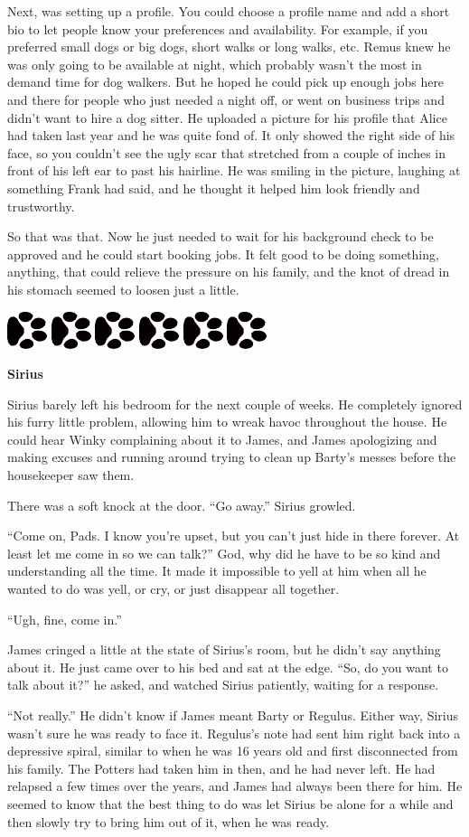 \documentclass[12pt,twoside,openright]{memoir}
\newcommand{\myrulez}{	
	\begin{center}
		\hspace{.5em}
		\includegraphics[angle=60]{dogprint.pdf}
		\hspace{.5em}
		\includegraphics[angle=120]{dogprint.pdf}
		\hspace{.5em}
		\includegraphics[angle=60]{dogprint.pdf}
		\hspace{.5em}
		\includegraphics[angle=120]{dogprint.pdf}
		\hspace{.5em}
		\includegraphics[angle=60]{dogprint.pdf}
		\hspace{.5em}
		\includegraphics[angle=120]{dogprint.pdf}
		\hspace{.5em}
	\end{center}
}
\begin{document}
Next, was setting up a profile. You could choose a profile name and add a short bio to let people know your preferences and availability. For example, if you preferred small dogs or big dogs, short walks or long walks, etc. Remus knew he was only going to be available at night, which probably wasn't the most in demand time for dog walkers. But he hoped he could pick up enough jobs here and there for people who just needed a night off, or went on business trips and didn't want to hire a dog sitter. He uploaded a picture for his profile that Alice had taken last year and he was quite fond of. It only showed the right side of his face, so you couldn't see the ugly scar that stretched from a couple of inches in front of his left ear to past his hairline. He was smiling in the picture, laughing at something Frank had said, and he thought it helped him look friendly and trustworthy. 

So that was that. Now he just needed to wait for his background check to be approved and he could start booking jobs. It felt good to be doing something, anything, that could relieve the pressure on his family, and the knot of dread in his stomach seemed to loosen just a little.

\myrulez

\textbf{Sirius} 

Sirius barely left his bedroom for the next couple of weeks. He completely ignored his furry little problem, allowing him to wreak havoc throughout the house. He could hear Winky complaining about it to James, and James apologizing and making excuses and running around trying to clean up Barty's messes before the housekeeper saw them.

There was a soft knock at the door. ``Go away.'' Sirius growled. 

``Come on, Pads. I know you're upset, but you can't just hide in there forever. At least let me come in so we can talk?''
God, why did he have to be so kind and understanding all the time. It made it impossible to yell at him when all he wanted to do was yell, or cry, or just disappear all together. 

``Ugh, fine, come in.''

James cringed a little at the state of Sirius's room, but he didn't say anything about it. He just came over to his bed and sat at the edge. ``So, do you want to talk about it?'' he asked, and watched Sirius patiently, waiting for a response.

``Not really.'' He didn't know if James meant Barty or Regulus. Either way, Sirius wasn't sure he was ready to face it. Regulus's note had sent him right back into a depressive spiral, similar to when he was 16 years old and first disconnected from his family. The Potters had taken him in then, and he had never left. He had relapsed a few times over the years, and James had always been there for him. He seemed to know that the best thing to do was let Sirius be alone for a while and then slowly try to bring him out of it, when he was ready. 
\end{document}
